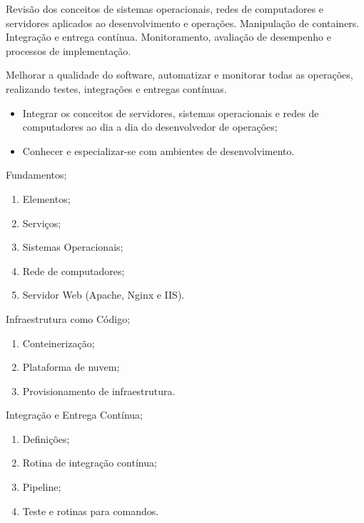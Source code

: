 \begin{pud}

	\ementa
	Revisão dos conceitos de sistemas operacionais, redes de computadores e
servidores aplicados ao desenvolvimento e operações. Manipulação de containers.
Integração e entrega contínua. Monitoramento, avaliação de desempenho e
processos de implementação.

	\objetivos
	Melhorar a qualidade do software, automatizar e monitorar todas
as operações, realizando testes, integrações e entregas contínuas.
	\begin{itemize}
	  \item Integrar os conceitos de servidores, sistemas operacionais e redes de
computadores ao dia a dia do desenvolvedor de operações;
\item Conhecer e especializar-se com ambientes de desenvolvimento.
	\end{itemize}
	
	\programa
	\begin{description}[itemsep=0em]

		\item[UNIDADE I:] Fundamentos; 
        \begin{enumerate}[itemsep=0em, topsep=0em]
			\item Elementos;
			\item Serviços;
			\item Sistemas Operacionais;
			\item Rede de computadores;
			\item Servidor Web (Apache, Nginx e IIS).
		\end{enumerate}
		
		\item[UNIDADE II:] Infraestrutura como Código; 
        \begin{enumerate}[itemsep=0em, topsep=0em]
			\item Conteinerização;
			\item Plataforma de nuvem;
			\item Provisionamento de infraestrutura.
		\end{enumerate}
		
		\item[UNIDADE III:] Integração e Entrega Contínua; 
        \begin{enumerate}[itemsep=0em, topsep=0em]
			\item Definições;
			\item Rotina de integração contínua;
			\item Pipeline;
			\item Teste e rotinas para comandos.
		\end{enumerate}
		

\end{description}
\end{pud}
